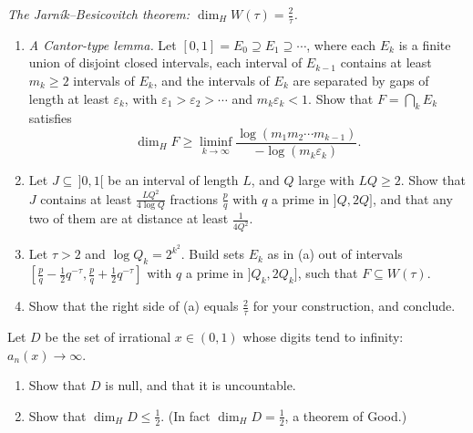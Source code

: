 \begin{exercise}[Journey]\label{pb:jarnik}
\emph{The Jarník--Besicovitch theorem: $\dim_HW(\tau)=\frac2\tau$.}
\begin{enumerate}[label=(\alph*)]
\item \emph{A Cantor-type lemma.} Let $[0,1]=E_0\supseteq E_1\supseteq\cdots$, where each $E_k$ is a finite union of disjoint closed intervals, each
interval of $E_{k-1}$ contains at least $m_k\ge2$ intervals of $E_k$, and the intervals of $E_k$ are separated by gaps of length at least
$\varepsilon_k$, with $\varepsilon_1>\varepsilon_2>\cdots$ and $m_k\varepsilon_k<1$. Show that $F=\bigcap_kE_k$ satisfies
\[
\dim_HF\ge\liminf_{k\to\infty}\frac{\log(m_1m_2\cdots m_{k-1})}{-\log(m_k\varepsilon_k)}.
\]
\item Let $J\subseteq\,]0,1[$ be an interval of length $L$, and $Q$ large with $LQ\ge2$. Show that $J$ contains at least $\frac{LQ^2}{4\log Q}$
fractions $\frac pq$ with $q$ a prime in $]Q,2Q]$, and that any two of them are at distance at least $\frac1{4Q^2}$.
\item Let $\tau>2$ and $\log Q_k=2^{k^2}$. Build sets $E_k$ as in (a) out of intervals $[\frac pq-\frac12q^{-\tau},\frac pq+\frac12q^{-\tau}]$ with $q$ a
prime in $]Q_k,2Q_k]$, such that $F\subseteq W(\tau)$.
\item Show that the right side of (a) equals $\frac2\tau$ for your construction, and conclude.
\end{enumerate}
\end{exercise}

\begin{exercise}[$\star\star$]\label{pb:good}
Let $D$ be the set of irrational $x\in(0,1)$ whose digits tend to infinity: $a_n(x)\to\infty$.
\begin{enumerate}[label=(\alph*)]
\item Show that $D$ is null, and that it is uncountable.
\item Show that $\dim_HD\le\frac12$. (In fact $\dim_HD=\frac12$, a theorem of Good.)
\end{enumerate}
\end{exercise}

